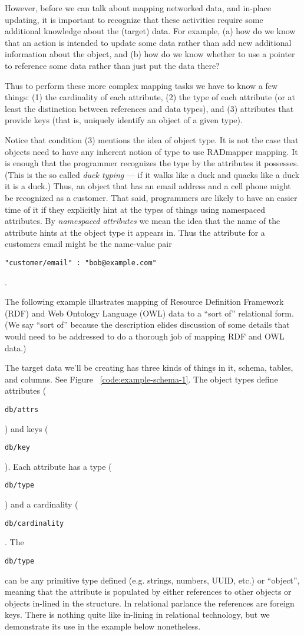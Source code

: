 \documentclass[9pt,letterpaper]{article}
\newcommand{\stt}[1]{\begin{footnotesize}\texttt{#1}\end{footnotesize}}
\begin{document}
However, before we can talk about mapping networked data, and in-place updating, it is important to recognize that these activities require
some additional knowledge about the (target) data.
For example,
(a) how do we know that an action is intended to update some data rather than add new additional information about the object, and
(b) how do we know whether to use a pointer to reference some data rather than just put the data there?

Thus to perform these more complex mapping tasks we have to know a few things:
(1) the cardinality of each attribute,
(2) the type of each attribute (or at least the distinction between references and data types), and
(3) attributes that provide keys (that is, uniquely identify an object of a given type).

Notice that condition (3) mentions the idea of object type.
It is not the case that objects need to have any inherent notion of type to use RADmapper mapping.
It is enough that the programmer recognizes the type by the attributes it possesses.
(This is the so called \textit{duck typing} --- if it walks like a duck and quacks like a duck it is a duck.)
Thus, an object that has an email address and a cell phone might be recognized as a customer.
That said, programmers are likely to have an easier time of it if they explicitly hint at the types of things using namespaced attributes.
By \textit{namespaced attributes} we mean the idea that the name of the attribute hints at the object type it appears in.
Thus the attribute for a customers email might be the name-value pair \stt{"customer/email" : "bob@example.com"}.

The following example illustrates mapping of Resource Definition Framework (RDF) and Web Ontology Language (OWL) data to
a ``sort of'' relational form. (We say ``sort of'' because the description elides discussion of some details that would need
to be addressed to do a thorough job of mapping RDF and OWL data.)

The target data we'll be creating has three kinds of things in it, schema, tables, and columns.
See Figure ~\ref{code:example-schema-1}.
The object types define attributes (\stt{db/attrs}) and keys (\stt{db/key}).
Each attribute has a type (\stt{db/type}) and a cardinality (\stt{db/cardinality}.
The \stt{db/type} can be any primitive type defined (e.g. strings, numbers, UUID, etc.) or ``object'', meaning that
the attribute is populated by either references to other objects or objects in-lined in the structure.
In relational parlance the references are foreign keys.
There is nothing quite like in-lining in relational technology, but we demonstrate its use in the example below nonetheless.
\end{document}
